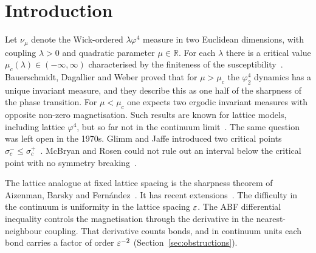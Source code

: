 
\section{Introduction}\label{sec:intro}

Let $\nu_{\mu}$ denote the Wick-ordered $\lambda\varphi^4$ measure in two Euclidean dimensions, with coupling $\lambda>0$ and quadratic parameter $\mu\in\mathbb R$. For each $\lambda$ there is a critical value $\mu_c(\lambda)\in(-\infty,\infty)$ characterised by the finiteness of the susceptibility~\cite{BDW25}. Bauerschmidt, Dagallier and Weber proved that for $\mu>\mu_c$ the $\varphi^4_2$ dynamics has a unique invariant measure, and they describe this as one half of the sharpness of the phase transition. For $\mu<\mu_c$ one expects two ergodic invariant measures with opposite non-zero magnetisation. Such results are known for lattice models, including lattice $\varphi^4$, but so far not in the continuum limit~\cite[Introduction]{BDW25}. The same question was left open in the 1970s. Glimm and Jaffe introduced two critical points $\sigma_c^{-}\le\sigma_c^{+}$~\cite{GJ75}. McBryan and Rosen could not rule out an interval below the critical point with no symmetry breaking~\cite{MR76}.

The lattice analogue at fixed lattice spacing is the sharpness theorem of Aizenman, Barsky and Fern\'andez~\cite{ABF87}. It has recent extensions~\cite{GPPS22,PV26,vEHL26}. The difficulty in the continuum is uniformity in the lattice spacing $\varepsilon$. The ABF differential inequality controls the magnetisation through the derivative in the nearest-neighbour coupling. That derivative counts bonds, and in continuum units each bond carries a factor of order $\varepsilon^{-2}$ (Section~\ref{sec:obstructions}).


